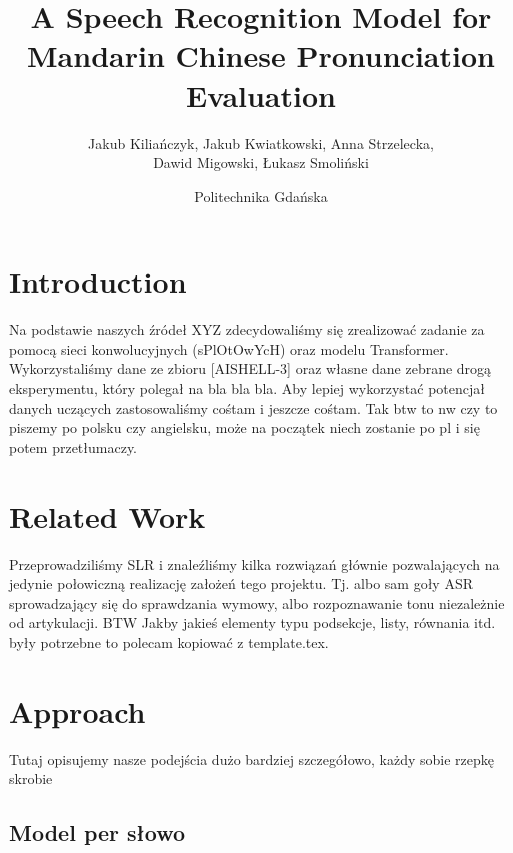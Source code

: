 \documentclass[
	a4paper, %
	10pt, %
	unnumberedsections, %
	twoside, %
]{LTJournalArticle}
\title{A Speech Recognition Model for Mandarin Chinese Pronunciation Evaluation} %
\author{%
Jakub Kiliańczyk, %
Jakub Kwiatkowski, %
Anna Strzelecka, \\ %
Dawid Migowski, %
Łukasz Smoliński %
}
\date{\footnotesize{Politechnika Gdańska}}
\begin{document}
\maketitle %


\section{Introduction}

Na podstawie naszych źródeł XYZ zdecydowaliśmy się zrealizować zadanie za pomocą sieci konwolucyjnych (sPlOtOwYcH)
oraz modelu Transformer. %
Wykorzystaliśmy dane ze zbioru [AISHELL-3] oraz własne dane zebrane drogą eksperymentu, który polegał na bla bla bla.
Aby lepiej wykorzystać potencjał danych uczących zastosowaliśmy cośtam i jeszcze cośtam.
Tak btw to nw czy to piszemy po polsku czy angielsku, może na początek niech zostanie po pl i się potem przetłumaczy.


\section{Related Work}

Przeprowadziliśmy SLR i znaleźliśmy kilka rozwiązań głównie pozwalających na jedynie połowiczną realizację założeń tego projektu.
Tj. albo sam goły ASR sprowadzający się do sprawdzania wymowy, albo rozpoznawanie tonu niezależnie od artykulacji.
BTW Jakby jakieś elementy typu podsekcje, listy, równania itd. były potrzebne to polecam kopiować z template.tex.


\section{Approach}

Tutaj opisujemy nasze podejścia dużo bardziej szczegółowo, każdy sobie rzepkę skrobie

\subsection{Model per słowo}
\end{document}
